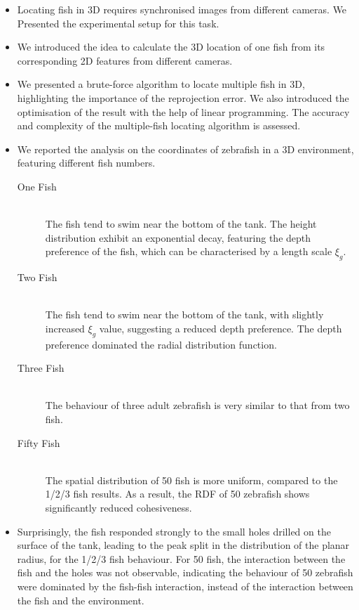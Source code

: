 \documentclass[11pt,twoside]{report}
\begin{document}
\begin{adjustwidth}{0cm}{-5cm}
\begin{tcolorbox}[
fonttitle=\sffamily\Large,
right=0.1\linewidth,
top=5mm,
bottom=5mm,
title=Summary of Chapter~4,
]

\begin{itemize}
	\item Locating fish in 3D requires synchronised images from different cameras. We Presented the experimental setup for this task.
	\item We introduced the idea to calculate the 3D location of one fish from its corresponding 2D features from different cameras.
	\item We presented a brute-force algorithm to locate multiple fish in 3D, highlighting the importance of the reprojection error. We also introduced the optimisation of the result with the help of linear programming. The accuracy and complexity of the multiple-fish locating algorithm is assessed.
	\item We reported the analysis on the coordinates of zebrafish in a 3D environment, featuring different fish numbers.
	\begin{description}
		\item[One Fish] \hfill \\
		The fish tend to swim near the bottom of the tank. The height distribution exhibit an exponential decay, featuring the depth preference of the fish, which can be characterised by a length scale $\xi_g$.
		\item[Two Fish] \hfill \\
		The fish tend to swim near the bottom of the tank, with slightly increased $\xi_g$ value, suggesting a reduced depth preference. The depth preference dominated the radial distribution function.
		\item[Three Fish] \hfill \\
		The behaviour of three adult zebrafish is very similar to that from two fish.
		\item[Fifty Fish] \hfill \\
		The spatial distribution of 50 fish is more uniform, compared to the 1/2/3 fish results. As a result, the RDF of 50 zebrafish shows significantly reduced cohesiveness.
	\end{description}
	\item Surprisingly, the fish responded strongly to the small holes drilled on the surface of the tank, leading to the peak split in the distribution of the planar radius, for the 1/2/3 fish behaviour. For 50 fish, the interaction between the fish and the holes was not observable, indicating the behaviour of 50 zebrafish were dominated by the fish-fish interaction, instead of the interaction between the fish and the environment.
\end{itemize}
\end{tcolorbox}

\end{adjustwidth}
\end{document}
